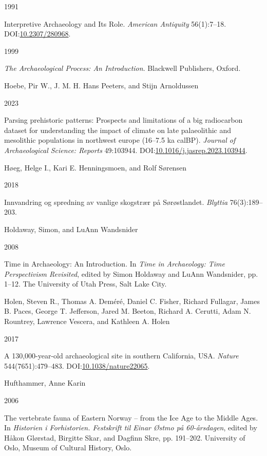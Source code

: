 \documentclass[
  12pt,
  a4paper,
  oneside]{book}
\newlength{\cslhangindent}
\newlength{\csllabelwidth}
\newlength{\cslentryspacingunit} %
\newenvironment{CSLReferences}[2] %
 {%
  \setlength{\parindent}{0pt}
  \ifodd #1
  \let\oldpar\par
  \def\par{\hangindent=\cslhangindent\oldpar}
  \fi
  \setlength{\parskip}{#2\cslentryspacingunit}
 }%
 {}
\newcommand{\CSLBlock}[1]{#1\hfill\break}
\newcommand{\CSLLeftMargin}[1]{\parbox[t]{\csllabelwidth}{#1}}
\newcommand{\CSLRightInline}[1]{\parbox[t]{\linewidth - \csllabelwidth}{#1}\break}
\begin{document}
\begin{CSLReferences}{0}{0}
\leavevmode{}%
\CSLLeftMargin{ 1991 }%
\CSLRightInline{Interpretive Archaeology and Its Role. \emph{American Antiquity} 56(1):7--18. DOI:\href{https://doi.org/10.2307/280968}{10.2307/280968}.}

\leavevmode{}%
\CSLLeftMargin{ 1999 }%
\CSLRightInline{\emph{{The Archaeological Process: An Introduction}}. Blackwell Publishers, Oxford.}

\leavevmode{}%
\CSLBlock{Hoebe, Pir W., J. M. H. Hans Peeters, and Stijn Arnoldussen}
\CSLLeftMargin{ 2023}%
\CSLRightInline{Parsing prehistoric patterns: Prospects and limitations of a big radiocarbon dataset for understanding the impact of climate on late palaeolithic and mesolithic populations in northwest europe (16--7.5 ka calBP). \emph{Journal of Archaeological Science: Reports} 49:103944. DOI:\href{https://doi.org/10.1016/j.jasrep.2023.103944}{10.1016/j.jasrep.2023.103944}.}

\leavevmode{}%
\CSLBlock{Høeg, Helge I., Kari E. Henningsmoen, and Rolf Sørensen}
\CSLLeftMargin{ 2018}%
\CSLRightInline{{Innvandring og spredning av vanlige skogstrær på Sørøstlandet}. \emph{Blyttia} 76(3):189--203.}

\leavevmode{}%
\CSLBlock{Holdaway, Simon, and LuAnn Wandsnider}
\CSLLeftMargin{ 2008}%
\CSLRightInline{{Time in Archaeology: An Introduction}. In \emph{{Time in Archaeology: Time Perspectivism Revisited}}, edited by Simon Holdaway and LuAnn Wandsnider, pp. 1--12. The University of Utah Press, Salt Lake City.}

\leavevmode{}%
\CSLBlock{Holen, Steven R., Thomas A. Deméré, Daniel C. Fisher, Richard Fullagar, James B. Paces, George T. Jefferson, Jared M. Beeton, Richard A. Cerutti, Adam N. Rountrey, Lawrence Vescera, and Kathleen A. Holen}
\CSLLeftMargin{ 2017}%
\CSLRightInline{A 130,000-year-old archaeological site in southern California, USA. \emph{Nature} 544(7651):479--483. DOI:\href{https://doi.org/10.1038/nature22065}{10.1038/nature22065}.}

\leavevmode{}%
\CSLBlock{Hufthammer, Anne Karin}
\CSLLeftMargin{ 2006}%
\CSLRightInline{{The vertebrate fauna of Eastern Norway -- from the Ice Age to the Middle Ages}. In \emph{{Historien i Forhistorien. Festskrift til Einar Østmo på 60-årsdagen}}, edited by Håkon Glørstad, Birgitte Skar, and Dagfinn Skre, pp. 191--202. University of Oslo, Museum of Cultural History, Oslo.}


\end{CSLReferences}
\end{document}
